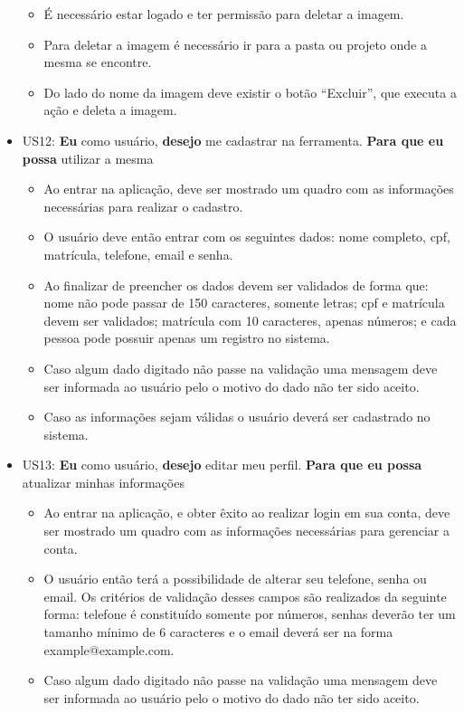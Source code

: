 \begin{itemize}
    \begin{itemize}
    	\item É necessário estar logado e ter permissão para deletar a imagem. 
    	\item Para deletar a  imagem é necessário ir para a pasta ou projeto onde a mesma se encontre.
    	\item Do lado do nome da imagem deve existir o botão “Excluir”, que executa a ação e deleta a imagem.
    \end{itemize}
    \item US12: \textbf{Eu} como usuário, \textbf{desejo} me cadastrar na ferramenta. \textbf{Para que eu possa} utilizar a mesma 
    \begin{itemize}
    	\item Ao entrar na aplicação, deve ser mostrado um quadro com as informações necessárias para realizar o cadastro.
    	\item O usuário deve então entrar com os seguintes dados: nome completo, cpf, matrícula, telefone, email e senha. 
    	\item Ao finalizar de preencher os dados devem ser validados de forma que: nome não pode passar de 150 caracteres, somente letras; cpf e matrícula devem ser validados; matrícula com 10 caracteres, apenas números;  e cada pessoa pode possuir apenas um registro no sistema.
    	\item Caso algum dado digitado não passe na validação uma mensagem deve ser informada ao usuário pelo o motivo do dado não ter sido aceito.
    	\item Caso as informações sejam válidas o usuário deverá ser cadastrado no sistema.
    \end{itemize}
    \item US13: \textbf{Eu} como usuário, \textbf{desejo} editar meu perfil. \textbf{Para que eu possa} atualizar minhas informações
    \begin{itemize}
    	\item Ao entrar na aplicação, e obter êxito ao realizar login em sua conta, deve ser mostrado um quadro com as informações necessárias para gerenciar a conta.
    	\item O usuário então terá a possibilidade de alterar seu telefone, senha ou email. Os critérios de validação desses campos são realizados da seguinte forma: telefone é constituído somente por números, senhas deverão ter um tamanho mínimo de 6 caracteres e o email deverá ser na forma example@example.com.
    	\item Caso algum dado digitado não passe na validação uma mensagem deve ser informada ao usuário pelo o motivo do dado não ter sido aceito.

\end{itemize}
\end{itemize}

